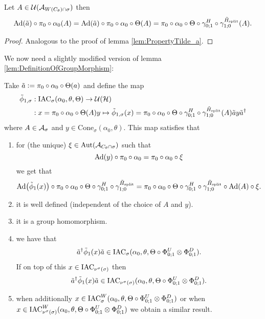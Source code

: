 \documentclass[11pt,a4paper,twoside]{article}
\numberwithin{equation}{section}
\begin{document}
\begin{lemma}\label{lem:PropertyTilde_aTwoTranslations}
	Let $A\in\UU(\AA_{W(C_\theta)\cap\sigma})$ then
	\begin{equation}
	\Ad{\tilde{a}}\circ\pi_0\circ\alpha_0(A)=\Ad{\tilde{a}}\circ\pi_0\circ\alpha_0\circ\Theta(A)=\pi_0\circ\alpha_0\circ\Theta\circ\gamma^H_{0;1}\circ\gamma^{\HsplitTilde}_{1;0}(A).
	\end{equation}
\end{lemma}
\begin{proof}
	Analogous to the proof of lemma \ref{lem:PropertyTilde_a}.
\end{proof}
We now need a slightly modified version of lemma \ref{lem:DefinitionOfGroupMorphism}:
\begin{lemma}\label{lem:DefinitionOfGroupMorphismTwoTranslations}
	Take $\tilde{a}\defeq \pi_0\circ\alpha_0\circ\Theta(a)$ and define the map
	\begin{align}
		\phiTilde_{1,\sigma}&:\IAC_{\sigma}(\alpha_0,\theta,\Theta) \rightarrow \UU(\HH)\\
		\nonumber
		&:x=\pi_0\circ\alpha_0\circ\Theta(A)y\mapsto \phiTilde_{1,\sigma}(x)=\pi_0\circ\alpha_0\circ\Theta\circ\gamma^H_{0;1}\circ\gamma^{\HsplitTilde}_{1;0}(A)\tilde{a}y\tilde{a}^\dagger
	\end{align}
	where $A\in\AA_{\sigma}$ and $y\in\textrm{Cone}_{\sigma}(\alpha_0,\theta)$. This map satisfies that
	\begin{enumerate}
		\item  for (the unique) $\xi\in\Aut{\AA_{C_\theta\cap \sigma}}$ such that
		\begin{equation}
			\Ad{y}\circ\pi_0\circ\alpha_0=\pi_0\circ\alpha_0\circ\xi
		\end{equation}
		we get that
		\begin{equation}\label{eq:ConditionDefinitionOfGroupMorphismTwoTranslations}
			\Ad{\phiTilde_1(x)}\circ\pi_0\circ\alpha_0\circ\Theta\circ\gamma^H_{0;1}\circ\gamma^{\HsplitTilde}_{1;0}=\pi_0\circ\alpha_0\circ\Theta\circ\gamma^H_{0;1}\circ\gamma^{\HsplitTilde}_{1;0}\circ\Ad{A}\circ\xi.
		\end{equation}
		\item it is well defined (independent of the choice of $A$ and $y$).
		\item it is a group homomorphism.
		\item we have that
			\begin{equation}
				\tilde{a}^\dagger\phiTilde_1(x)\tilde{a}\in\IAC_\sigma(\alpha_0,\theta,\Theta\circ \Phi^U_{0;1}\otimes\Phi^D_{0;1}).
			\end{equation}
			If on top of this $x\in\IAC_{\nu^\sigma(\sigma)}$ then
			\begin{equation}
				\tilde{a}^\dagger\phiTilde_1(x)\tilde{a}\in\IAC_{\nu^\sigma(\sigma)}(\alpha_0,\theta,\Theta\circ \Phi^U_{0;1}\otimes\Phi^D_{0;1}).
			\end{equation}
		\item when additionally $x\in\IAC_{\sigma}^W(\alpha_0,\theta,\Theta\circ \Phi^U_{0;1}\otimes\Phi^D_{0;1})$ or when $x\in\IAC_{\nu^\sigma(\sigma)}^W(\alpha_0,\theta,\Theta\circ \Phi^U_{0;1}\otimes\Phi^D_{0;1})$ we obtain a similar result.
	\end{enumerate}
\end{lemma}
\end{document}
